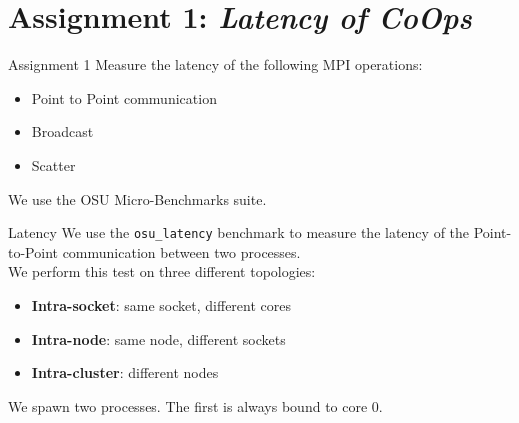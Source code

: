 
\section{Assignment 1: \newline \textit{Latency of CoOps}}
\begin{frame}[fragile]{Assignment 1}
    Measure the latency of the following MPI operations:
    \begin{itemize}
        \item Point to Point communication
        \item Broadcast
        \item Scatter
    \end{itemize}
    We use the OSU Micro-Benchmarks suite.
\end{frame}


%
%
\begin{frame}[fragile,t]{Latency}
    We use the \texttt{osu\_latency} benchmark to measure the latency
    of the Point-to-Point communication between two processes. \\
    We perform this test on three different topologies:
    \begin{itemize}
        \item \textbf{Intra-socket}: same socket, different cores
        \item \textbf{Intra-node}: same node, different sockets
        \item \textbf{Intra-cluster}: different nodes
    \end{itemize}
    We spawn two processes. The first is always bound to core 0.
\end{frame}
